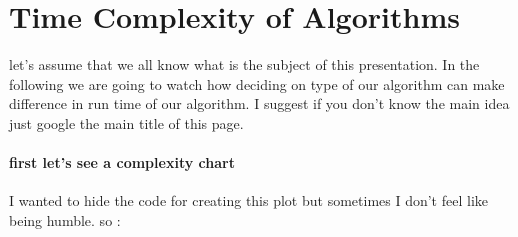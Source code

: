 \documentclass[]{article}
\title{}
\author{}
\date{}
\let\oldparagraph\paragraph
\renewcommand{\paragraph}[1]{\oldparagraph{#1}\mbox{}}
\begin{document}
\section{Time Complexity of
Algorithms}\label{time-complexity-of-algorithms}

let's assume that we all know what is the subject of this presentation.
In the following we are going to watch how deciding on type of our
algorithm can make difference in run time of our algorithm. I suggest if
you don't know the main idea just google the main title of this page.

\paragraph{first let's see a complexity
chart}\label{first-lets-see-a-complexity-chart}

I wanted to hide the code for creating this plot but sometimes I don't
feel like being humble. so :
\end{document}
